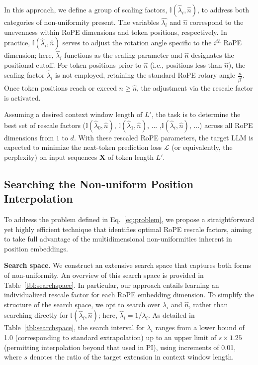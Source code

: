 In this approach, we define a group of scaling factors, $\mathbb{I}(\hat{\lambda}_{i},\hat{n})$, to address both categories of non-uniformity present. The variables $\hat{\lambda_i}$ and $\hat{n}$ correspond to the unevenness within RoPE dimensions and token positions, respectively. In practice, $\mathbb{I}(\hat{\lambda}_{i},\hat{n})$ serves to adjust the rotation angle specific to the $i^{th}$ RoPE dimension; here, $\hat\lambda_{i}$ functions as the scaling parameter and $\hat{n}$ designates the positional cutoff. For token positions prior to $\hat{n}$ (i.e., positions less than $\hat{n}$), the scaling factor $\hat\lambda_{i}$ is not employed, retaining the standard RoPE rotary angle $\frac{n}{\beta^i}$. Once token positions reach or exceed $n \ge \hat{n}$, the adjustment via the rescale factor is activated.

Assuming a desired context window length of $L'$, the task is to determine the best set of rescale factors ($\mathbb{I}(\hat{\lambda}_{0},\hat{n})$, $\mathbb{I}(\hat{\lambda}_{1},\hat{n})$, ... ,$\mathbb{I}(\hat{\lambda}_{i},\hat{n})$, ...) across all RoPE dimensions from $1$ to $d$. With these rescaled RoPE parameters, the target $\text{LLM}$ is expected to minimize the next-token prediction loss $\mathcal{L}$ (or equivalently, the perplexity) on input sequences $\mathbf{X}$ of token length $L'$.

\subsection{Searching the Non-uniform Position Interpolation}

To address the problem defined in Eq.~\ref{eq:problem}, we propose a straightforward yet highly efficient technique that identifies optimal RoPE rescale factors, aiming to take full advantage of the multidimensional non-uniformities inherent in position embeddings.

\textbf{Search space}. We construct an extensive search space that captures both forms of non-uniformity. An overview of this search space is provided in Table~\ref{tbl:searchspace}. In particular, our approach entails learning an individualized rescale factor for each RoPE embedding dimension. To simplify the structure of the search space, we opt to search over $\lambda_i$ and $\hat{n}$, rather than searching directly for $\mathbb{I}(\hat{\lambda}_{i},\hat{n})$; here, $\hat{\lambda}_{i}=1/\lambda_i$. As detailed in Table~\ref{tbl:searchspace}, the search interval for $\lambda_i$ ranges from a lower bound of 1.0 (corresponding to standard extrapolation) up to an upper limit of $s\times1.25$ (permitting interpolation beyond that used in PI), using increments of 0.01, where $s$ denotes the ratio of the target extension in context window length.

